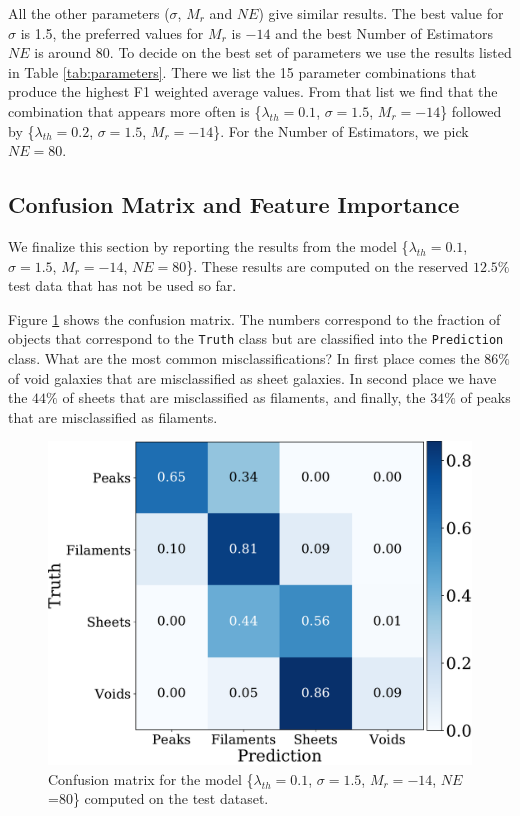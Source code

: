 \documentclass[usenatbib]{mnras}
\begin{document}
All the other parameters ($\sigma$, $M_r$ and $NE$) give similar results.
The best value for $\sigma$ is 1.5, the preferred values
for $M_r$ is $-14$ and the best Number of
Estimators $NE$ is around $80$.
To decide on the best set of parameters we use the results listed in
Table \ref{tab:parameters}.
There we list the 15 parameter combinations that
produce the highest F1 weighted average values.
From that list we find that the combination that appears more often is 
\{$\lambda_{th}=0.1$, $\sigma=1.5$, $M_r=-14$\} followed by 
\{$\lambda_{th}=0.2$, $\sigma=1.5$, $M_r=-14$\}.
For the Number of Estimators, we pick $NE=80$.



\subsection{Confusion Matrix and Feature Importance}

We finalize this section by reporting the results from the model 
\{$\lambda_{th}=0.1$, $\sigma=1.5$, $M_r=-14$, $NE=80$\}.
These results are computed on the reserved $12.5\%$ test data that has not be used so far.

Figure \ref{fig:confusion_matrix} shows the confusion matrix.
The numbers correspond to the fraction of objects that correspond to
the \verb"Truth" class but are classified into the \verb"Prediction"
class.
What are the most common misclassifications?
In first place comes the $86\%$ of void galaxies that are misclassified
as sheet galaxies.  
In second place we have the $44\%$ of sheets that are misclassified
as filaments, and finally, the $34\%$ of peaks that are misclassified as filaments.

\begin{figure}
\centering
    \includegraphics[scale=0.35]{Figs/p_confusion_matrix_test.pdf}
\caption{Confusion matrix for the model 
      \{$\lambda_{th}=0.1$, $\sigma=1.5$, $M_r=-14$,
      $NE$=80\} computed on the test dataset.}
      \label{fig:confusion_matrix}
\end{figure}
\end{document}

